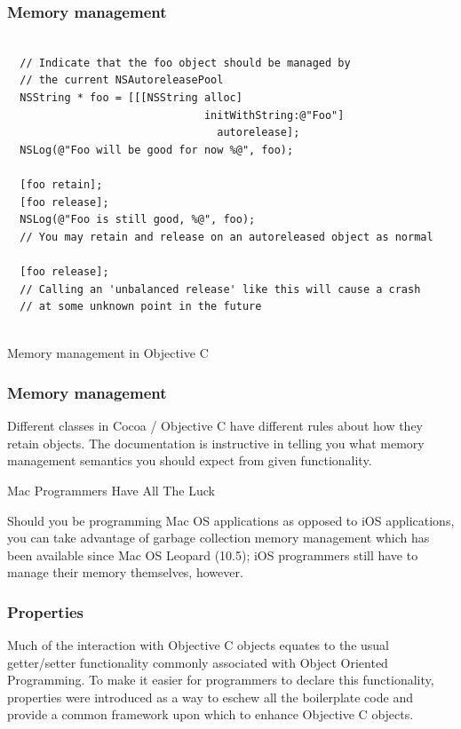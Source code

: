 \documentclass[10pt]{beamer}
\begin{document}
\begin{frame}[fragile]
  \frametitle{Memory management}
  \begin{listing}[H]
    \begin{verbatim}
  
  // Indicate that the foo object should be managed by
  // the current NSAutoreleasePool
  NSString * foo = [[[NSString alloc]
                               initWithString:@"Foo"]
                                 autorelease];
  NSLog(@"Foo will be good for now %@", foo);
  
  [foo retain]; 
  [foo release];
  NSLog(@"Foo is still good, %@", foo);
  // You may retain and release on an autoreleased object as normal
  
  [foo release];
  // Calling an 'unbalanced release' like this will cause a crash
  // at some unknown point in the future
              
  \end{verbatim}
    \caption{Memory management in Objective C}
    \label{listing:10}
  \end{listing}

\end{frame}

\begin{frame}[fragile]
  \frametitle{Memory management}
  Different classes in Cocoa / Objective C have different rules about how they retain objects.  The documentation is instructive in telling you what memory management semantics you should expect from given functionality.
\begin{block}{Mac Programmers Have All The Luck}
  
  Should you be programming Mac OS applications as opposed to iOS applications,
  you can take advantage of garbage collection memory management which has been
  available since Mac OS Leopard (10.5); iOS programmers still have to manage their
  memory themselves, however.
              
  \end{block}

\end{frame}

    
\begin{frame}[fragile]
  \frametitle{Properties}
  Much of the interaction with Objective C objects equates to the usual getter/setter functionality commonly associated with Object Oriented Programming. To make it easier for programmers to declare this functionality, properties were introduced as a way to eschew all the boilerplate code and provide a common framework upon which to enhance Objective C objects.

\end{frame}
\end{document}
